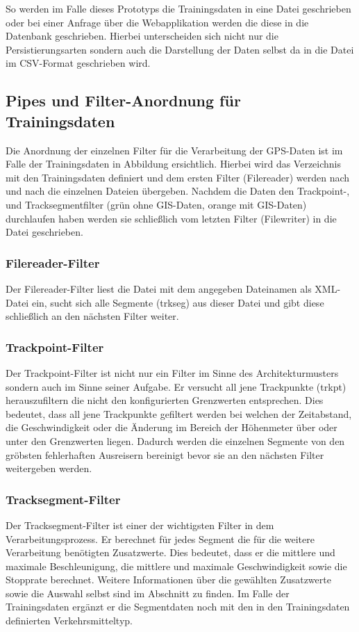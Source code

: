 So werden im Falle dieses Prototyps die Trainingsdaten in eine Datei geschrieben oder bei einer Anfrage über die Webapplikation werden die diese in die Datenbank geschrieben. Hierbei unterscheiden sich nicht nur die Persistierungsarten sondern auch die Darstellung der Daten selbst da in die Datei im CSV-Format geschrieben wird.

\subsection{Pipes und Filter-Anordnung für Trainingsdaten}
Die Anordnung der einzelnen Filter für die Verarbeitung der GPS-Daten ist im Falle der Trainingsdaten in Abbildung  ersichtlich. Hierbei wird das Verzeichnis mit den Trainingsdaten definiert und dem ersten Filter (Filereader) werden nach und nach die einzelnen Dateien übergeben. Nachdem die Daten den Trackpoint-, und Tracksegmentfilter (grün ohne GIS-Daten, orange mit GIS-Daten) durchlaufen haben werden sie schließlich vom letzten Filter (Filewriter) in die Datei geschrieben.


\subsubsection{Filereader-Filter}
Der Filereader-Filter liest die Datei mit dem angegeben Dateinamen als XML-Datei ein, sucht sich alle Segmente (trkseg) aus dieser Datei und gibt diese schließlich an den nächsten Filter weiter.

\subsubsection{Trackpoint-Filter}
Der Trackpoint-Filter ist nicht nur ein Filter im Sinne des Architekturmusters sondern auch im Sinne seiner Aufgabe. Er versucht all jene Trackpunkte (trkpt) herauszufiltern die nicht den konfigurierten Grenzwerten entsprechen. Dies bedeutet, dass all jene Trackpunkte gefiltert werden bei welchen der Zeitabstand, die Geschwindigkeit oder die Änderung im Bereich der Höhenmeter über oder unter den Grenzwerten liegen. Dadurch werden die einzelnen Segmente von den gröbsten fehlerhaften Ausreisern bereinigt bevor sie an den nächsten Filter weitergeben werden.

\subsubsection{Tracksegment-Filter}
\label{tracksegmentFilter}
Der Tracksegment-Filter ist einer der wichtigsten Filter in dem Verarbeitungsprozess. Er berechnet für jedes Segment die für die weitere Verarbeitung benötigten Zusatzwerte. Dies bedeutet, dass er die mittlere und maximale Beschleunigung, die mittlere und maximale Geschwindigkeit sowie die Stopprate berechnet. Weitere Informationen über die gewählten Zusatzwerte sowie die Auswahl selbst sind im Abschnitt  zu finden.  Im Falle der Trainingsdaten ergänzt er die Segmentdaten noch mit den in den Trainingsdaten definierten Verkehrsmitteltyp.

